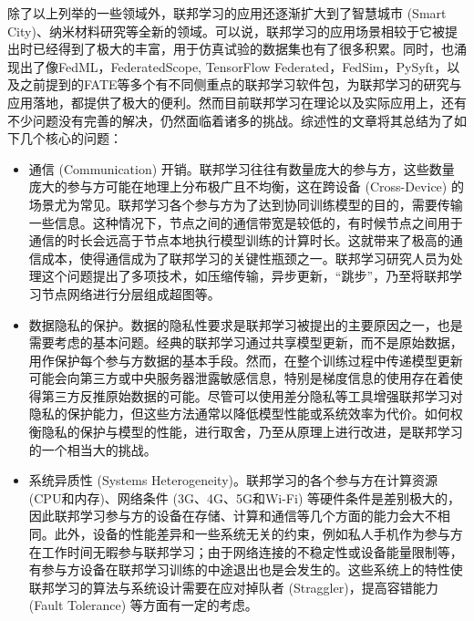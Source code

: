 除了以上列举的一些领域外，联邦学习的应用还逐渐扩大到了智慧城市 (Smart City)\cite{Zheng_2021_fl_smart_city}、纳米材料研究\cite{Huang_2022_fl_physics}等全新的领域。可以说，联邦学习的应用场景相较于它被提出时已经得到了极大的丰富，用于仿真试验的数据集也有了很多积累。同时，也涌现出了像FedML\cite{he_2020_fedml}，FederatedScope\cite{Xie_2023_fl_scope}, TensorFlow Federated\cite{tensorflow}，FedSim\cite{wu_2021_fedsim}，PySyft\cite{ryffel_2018_pysyft}，以及之前提到的FATE\cite{liu_2021_fate_fl}等多个有不同侧重点的联邦学习软件包，为联邦学习的研究与应用落地，都提供了极大的便利。然而目前联邦学习在理论以及实际应用上，还有不少问题没有完善的解决，仍然面临着诸多的挑战\cite{kairouz2019advances_fl, Li_2020_fl_challenges}。综述性的文章\parencite{Li_2020_fl_challenges, Wu_2020_iot_fl}将其总结为了如下几个核心的问题：
\begin{itemize}
\item 通信 (Communication) 开销。联邦学习往往有数量庞大的参与方，这些数量庞大的参与方可能在地理上分布极广且不均衡，这在跨设备 (Cross-Device) 的场景尤为常见。联邦学习各个参与方为了达到协同训练模型的目的，需要传输一些信息。这种情况下，节点之间的通信带宽是较低的，有时候节点之间用于通信的时长会远高于节点本地执行模型训练的计算时长。这就带来了极高的通信成本，使得通信成为了联邦学习的关键性瓶颈之一。联邦学习研究人员为处理这个问题提出了多项技术，如压缩传输\cite{seide2014_1bitsgd}，异步更新\cite{tran2021feddr}，``跳步''\cite{proxskip, zhang2020fedpd}，乃至将联邦学习节点网络进行分层组成超图\cite{t2020pfedme}等。
\item 数据隐私的保护。数据的隐私性要求是联邦学习被提出的主要原因之一，也是需要考虑的基本问题。经典的联邦学习通过共享模型更新，而不是原始数据，用作保护每个参与方数据的基本手段。然而，在整个训练过程中传递模型更新可能会向第三方或中央服务器泄露敏感信息，特别是梯度信息的使用存在着使得第三方反推原始数据的可能\cite{zhu2019deep_leakage}。尽管可以使用差分隐私\cite{Dwork_2008_DP}等工具增强联邦学习对隐私的保护能力，但这些方法通常以降低模型性能或系统效率为代价。如何权衡隐私的保护与模型的性能，进行取舍，乃至从原理上进行改进，是联邦学习的一个相当大的挑战。
\item 系统异质性 (Systems Heterogeneity)。联邦学习的各个参与方在计算资源 (CPU和内存)、网络条件 (3G、4G、5G和Wi-Fi) 等硬件条件是差别极大的，因此联邦学习参与方的设备在存储、计算和通信等几个方面的能力会大不相同。此外，设备的性能差异和一些系统无关的约束，例如私人手机作为参与方在工作时间无暇参与联邦学习；由于网络连接的不稳定性或设备能量限制等，有参与方设备在联邦学习训练的中途退出也是会发生的。这些系统上的特性使联邦学习的算法与系统设计需要在应对掉队者 (Straggler)，提高容错能力 (Fault Tolerance) 等方面有一定的考虑。

\end{itemize}
